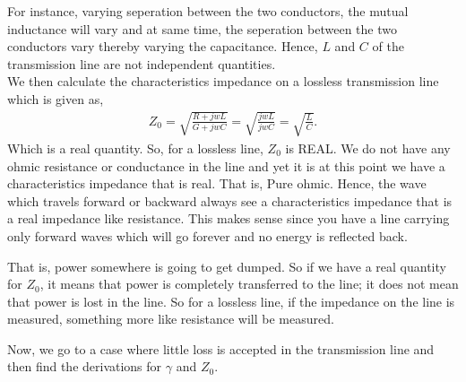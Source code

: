 For instance, varying seperation between the two conductors, the mutual inductance will vary and at same time, the seperation between the two conductors vary thereby varying the capacitance. Hence, $L$ and $C$ of the transmission line are not independent quantities.\\
We then calculate the characteristics impedance on a lossless transmission line which is given as,
\begin{align*}
Z_0 = \sqrt{\frac{R + jwL}{G + jwC}} = \sqrt{\frac{jwL}{jwC}} = \sqrt{\frac{L}{C}}.
\end{align*}
Which is a real quantity. So, for a lossless line, $Z_0$ is REAL. We do not have any ohmic resistance or conductance in the line and yet it is at this point we have a characteristics impedance that is real. That is, Pure ohmic. Hence, the wave which travels forward or backward always see a characteristics impedance that is a real impedance like resistance. This makes sense since you have a line carrying only forward waves which will go forever and no energy is reflected back. 

That is, power somewhere is going to get dumped. So if we have a real quantity for $Z_0$, it means that power is completely transferred to the line; it does not mean that power is lost in the line. So for a lossless line, if the impedance on the line is measured, something more like resistance will be measured.

Now, we go to a case where little loss is accepted in the transmission line and then find the derivations for $\gamma$ and $Z_0$.
